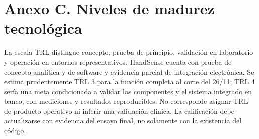 \documentclass[11pt,letterpaper]{article}
\begin{document}
\section*{Anexo C. Niveles de madurez tecnológica}
La escala TRL distingue concepto, prueba de principio, validación en laboratorio y operación en entornos representativos. HandSense cuenta con prueba de concepto analítica y de software y evidencia parcial de integración electrónica. Se estima prudentemente TRL 3 para la función completa al corte del 26/11; TRL 4 sería una meta condicionada a validar los componentes y el sistema integrado en banco, con mediciones y resultados reproducibles. No corresponde asignar TRL de producto operativo ni inferir una validación clínica. La calificación debe actualizarse con evidencia del ensayo final, no solamente con la existencia del código.
\end{document}
